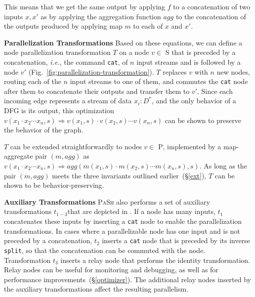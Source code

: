 \documentclass[sigplan, review, screen, anonymous]{acmart}
\newcommand{\ie}{{\em i.e.}, }
\newcommand{\heading}[1]{\vspace{4pt}\noindent\textbf{#1}\enspace}
\newcommand{\ttt}[1]{\texttt{#1}}
\newcommand{\cn}[1]{\mbox{\textcircled{\footnotesize #1}}}
\newcommand{\sta}{\cn{\textsc{S}}\xspace}
\newcommand{\pur}{\cn{\textsc{P}}\xspace}
\newcommand{\todo}[1]{\hl{#1}\xspace}
\newcommand{\kk}[1]{[{\color{magenta}kk: #1}]}
\newcommand{\km}[1]{[{\color{blue}km: #1}]}
\newcommand{\sx}[1]{(\S\ref{#1})}
\newcommand{\sys}{{\scshape PaSh}\xspace}
\begin{document}
\noindent
This means that we get the same output by applying $f$ to a
concatenation of two inputs $x, x'$ as by applying the aggregation function
$agg$ to the concatenation of the outputs produced by applying map $m$
to each of $x$ and $x'$.


\heading{Parallelization Transformations}
%
Based on these equations, we can define a node parallelization
  transformation $T$ on a node $v \in$ \sta that is preceded by a
concatenation, \ie the command \ttt{cat}, of $n$ input streams and is
followed by a node $v'$
(Fig.~\ref{fig:parallelization-transformation}). $T$
replaces $v$ with $n$ new nodes, routing each of the $n$ input streams
to one of them, and commutes the \ttt{cat} node after them to
concatenate their outputs and transfer them to $v'$. Since each
incoming edge represents a stream of data $x_i : D^*$, and the only
behavior of a DFG is its output, this optimization $v(x_1 \cdot x_2
\cdots x_n, s) \Rightarrow v(x_1, s) \cdot v(x_2, s) \cdots v(x_n, s)$
can be shown to preserve the behavior of the graph.

$T$ can be extended straightforwardly to nodes $v \in$ \pur,
implemented by a map-aggregate pair $(m, agg)$ as $ v(x_1 \cdot x_2
\cdots x_n, s) \Rightarrow agg(m(x_1, s) \cdot m(x_2, s) \cdots m(x_n,
s), s)$.
As long as the pair $(m, agg)$ meets the three invariants outlined earlier~\sx{ext}, 
$T$ can be shown to be behavior-preserving.

\heading{Auxiliary Transformations}
%
\sys also performs a set of auxiliary transformations $t_{1-3}$that are
depicted in . If a node has many
inputs, $t_1$ concatenates these inputs by inserting a \ttt{cat} node
to enable the parallelization transformations. In cases where a
parallelizable node has one input and is not preceded by a
concatenation, $t_2$ inserts a \ttt{cat} node that is preceded by its
inverse \ttt{split}, so that the concatenation can be commuted with
the node. Transformation $t_3$ inserts a relay node that
performs the identity transformation. Relay nodes can be useful for
monitoring and debugging, as well as for performance
improvements~\sx{optimizer}.
The additional relay nodes inserted by the auxiliary transformations affect the resulting %
  parallelism.
\end{document}
